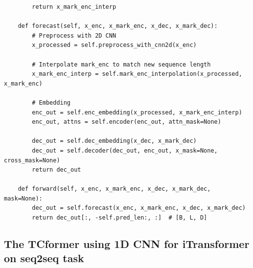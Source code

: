 \documentclass[stu,12pt,floatsintext]{apa7}
\begin{document}
\begin{verbatim}
        return x_mark_enc_interp

    def forecast(self, x_enc, x_mark_enc, x_dec, x_mark_dec):
        # Preprocess with 2D CNN
        x_processed = self.preprocess_with_cnn2d(x_enc)

        # Interpolate mark_enc to match new sequence length
        x_mark_enc_interp = self.mark_enc_interpolation(x_processed, x_mark_enc)

        # Embedding
        enc_out = self.enc_embedding(x_processed, x_mark_enc_interp)
        enc_out, attns = self.encoder(enc_out, attn_mask=None)

        dec_out = self.dec_embedding(x_dec, x_mark_dec)
        dec_out = self.decoder(dec_out, enc_out, x_mask=None, cross_mask=None)
        return dec_out

    def forward(self, x_enc, x_mark_enc, x_dec, x_mark_dec, mask=None):
        dec_out = self.forecast(x_enc, x_mark_enc, x_dec, x_mark_dec)
        return dec_out[:, -self.pred_len:, :]  # [B, L, D]
\end{verbatim}
\subsection{The TCformer using 1D CNN for iTransformer on seq2seq task}
\end{document}
